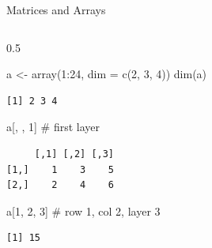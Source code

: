 \documentclass[
  ignorenonframetext,
  aspectratio=169,
]{beamer}
\newenvironment{Shaded}{\begin{snugshade}}{\end{snugshade}}
\newcommand{\AttributeTok}[1]{\textcolor[rgb]{0.40,0.45,0.13}{#1}}
\newcommand{\CommentTok}[1]{\textcolor[rgb]{0.37,0.37,0.37}{#1}}
\newcommand{\DecValTok}[1]{\textcolor[rgb]{0.68,0.00,0.00}{#1}}
\newcommand{\FunctionTok}[1]{\textcolor[rgb]{0.28,0.35,0.67}{#1}}
\newcommand{\NormalTok}[1]{\textcolor[rgb]{0.00,0.23,0.31}{#1}}
\newcommand{\OtherTok}[1]{\textcolor[rgb]{0.00,0.23,0.31}{#1}}
\newcommand{\SpecialCharTok}[1]{\textcolor[rgb]{0.37,0.37,0.37}{#1}}
\begin{document}
\begin{frame}[fragile]{Matrices and Arrays}
\begin{columns}[T]
\begin{column}{0.5\textwidth}
\begin{Shaded}
\begin{Highlighting}[]
\NormalTok{a }\OtherTok{\textless{}{-}} \FunctionTok{array}\NormalTok{(}\DecValTok{1}\SpecialCharTok{:}\DecValTok{24}\NormalTok{, }\AttributeTok{dim =} \FunctionTok{c}\NormalTok{(}\DecValTok{2}\NormalTok{, }\DecValTok{3}\NormalTok{, }\DecValTok{4}\NormalTok{))}
\FunctionTok{dim}\NormalTok{(a)}
\end{Highlighting}
\end{Shaded}

\begingroup\tiny\color{darkgray}

\begin{verbatim}
[1] 2 3 4
\end{verbatim}

\endgroup

\begin{Shaded}
\begin{Highlighting}[]
\NormalTok{a[, , }\DecValTok{1}\NormalTok{]     }\CommentTok{\# first layer}
\end{Highlighting}
\end{Shaded}

\begingroup\tiny\color{darkgray}

\begin{verbatim}
     [,1] [,2] [,3]
[1,]    1    3    5
[2,]    2    4    6
\end{verbatim}

\endgroup

\begin{Shaded}
\begin{Highlighting}[]
\NormalTok{a[}\DecValTok{1}\NormalTok{, }\DecValTok{2}\NormalTok{, }\DecValTok{3}\NormalTok{]   }\CommentTok{\# row 1, col 2, layer 3}
\end{Highlighting}
\end{Shaded}

\begingroup\tiny\color{darkgray}

\begin{verbatim}
[1] 15
\end{verbatim}

\endgroup
\end{column}
\end{columns}
\end{frame}
\end{document}
